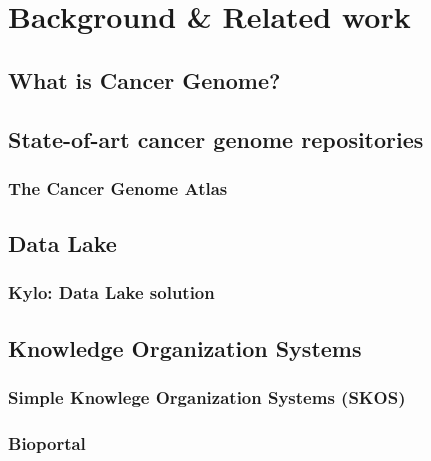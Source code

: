 %

\chapter{Background \& Related work}
\label{relatedwork}
\section{What is Cancer Genome?}
\section{State-of-art cancer genome repositories}
\subsection{The Cancer Genome Atlas}
\label{relatedwork.tcga}



\section{Data Lake}
\label{relatedework.fundamentals}
\subsection{Kylo: Data Lake solution }

\section{Knowledge Organization Systems}
\label{relatedework.kos}
\subsection{Simple Knowlege Organization Systems (SKOS)}
\label{relatedwork.skos}
\subsection{Bioportal}
\label{relatedwork.bioportal}

